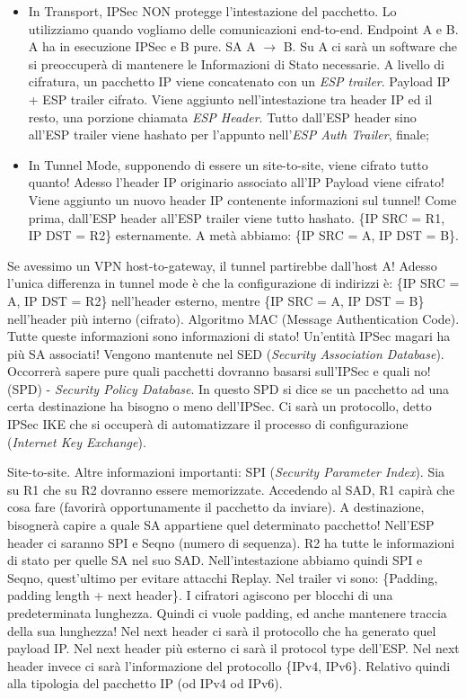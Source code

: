 \begin{itemize}

\item In Transport, IPSec NON protegge l'intestazione del pacchetto. Lo utilizziamo quando vogliamo delle comunicazioni end-to-end. Endpoint A e B. A ha in esecuzione IPSec e B pure. SA A $\rightarrow$ B. Su A ci sarà un software che si preoccuperà di mantenere le Informazioni di Stato necessarie. A livello di cifratura, un pacchetto IP viene concatenato con un \textit{ESP trailer}. Payload IP + ESP trailer cifrato. Viene aggiunto nell'intestazione tra header IP ed il resto, una porzione chiamata \textit{ESP Header}. Tutto dall'ESP header sino all'ESP trailer viene hashato per l'appunto nell'\textit{ESP Auth Trailer}, finale;

\item In Tunnel Mode, supponendo di essere un site-to-site, viene cifrato tutto quanto! Adesso l'header IP originario associato all'IP Payload viene cifrato! Viene aggiunto un nuovo header IP contenente informazioni sul tunnel! Come prima, dall'ESP header all'ESP trailer viene tutto hashato. \{IP SRC = R1, IP DST = R2\} esternamente. A metà abbiamo: \{IP SRC = A, IP DST = B\}.

\end{itemize}

Se avessimo un VPN host-to-gateway, il tunnel partirebbe dall'host A! Adesso l'unica differenza in tunnel mode è che la configurazione di indirizzi è: \{IP SRC = A, IP DST = R2\} nell'header esterno, mentre \{IP SRC = A, IP DST = B\} nell'header più interno (cifrato). Algoritmo MAC (Message Authentication Code). Tutte queste informazioni sono informazioni di stato! Un'entità IPSec magari ha più SA associati! Vengono mantenute nel SED (\textit{Security Association Database}). Occorrerà sapere pure quali pacchetti dovranno basarsi sull'IPSec e quali no! (SPD) - \textit{Security Policy Database}. In questo SPD si dice se un pacchetto ad una certa destinazione ha bisogno o meno dell'IPSec. Ci sarà un protocollo, detto IPSec IKE che si occuperà di automatizzare il processo di configurazione (\textit{Internet Key Exchange}).


Site-to-site. Altre informazioni importanti: SPI (\textit{Security Parameter Index}). Sia su R1 che su R2 dovranno essere memorizzate. Accedendo al SAD, R1 capirà che cosa fare (favorirà opportunamente il pacchetto da inviare). A destinazione, bisognerà capire a quale SA appartiene quel determinato pacchetto! Nell'ESP header ci saranno SPI e Seqno (numero di sequenza). R2 ha tutte le informazioni di stato per quelle SA nel suo SAD. Nell'intestazione abbiamo quindi SPI e Seqno, quest'ultimo per evitare attacchi Replay. Nel trailer vi sono: \{Padding, padding length + next header\}. I cifratori agiscono per blocchi di una predeterminata lunghezza. Quindi ci vuole padding, ed anche mantenere traccia della sua lunghezza! Nel next header ci sarà il protocollo che ha generato quel payload IP. Nel next header più esterno ci sarà il protocol type dell'ESP. Nel next header invece ci sarà l'informazione del protocollo \{IPv4, IPv6\}. Relativo quindi alla tipologia del pacchetto IP (od IPv4 od IPv6).

